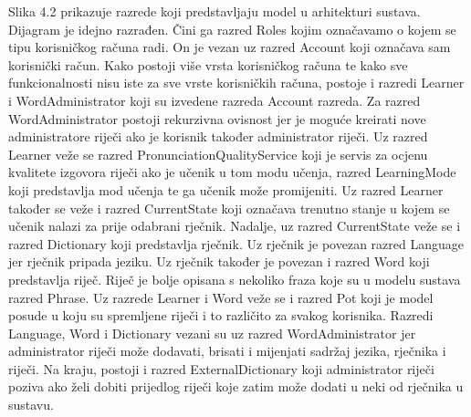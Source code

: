 			\newpage
			
			Slika 4.2 prikazuje razrede koji predstavljaju model u arhitekturi sustava. Dijagram je idejno razrađen. Čini ga razred Roles kojim označavamo o kojem se tipu korisničkog računa radi. On je vezan uz razred Account koji označava sam korisnički račun. Kako postoji više vrsta korisničkog računa te kako sve funkcionalnosti nisu iste za sve vrste korisničkih računa, postoje i razredi Learner i WordAdministrator koji su izvedene razreda Account razreda. Za razred WordAdministrator postoji rekurzivna ovisnost jer je moguće kreirati nove administratore riječi ako je korisnik također administrator riječi. Uz razred Learner veže se razred PronunciationQualityService koji je servis za ocjenu kvalitete izgovora riječi ako je učenik u tom modu učenja, razred LearningMode koji predstavlja mod učenja te ga učenik može promijeniti. Uz razred Learner također se veže i razred CurrentState koji označava trenutno stanje u kojem se učenik nalazi za prije odabrani rječnik. Nadalje, uz razred CurrentState veže se i razred Dictionary koji predstavlja rječnik. Uz rječnik je povezan razred Language jer rječnik pripada jeziku. Uz rječnik također je povezan i razred Word koji predstavlja riječ. Riječ je bolje opisana s nekoliko fraza koje su u modelu sustava razred Phrase. Uz razrede Learner i Word veže se i razred Pot koji je model posude u koju su spremljene riječi i to različito za svakog korisnika. Razredi Language, Word i Dictionary vezani su uz razred WordAdministrator jer administrator riječi može dodavati, brisati i mijenjati sadržaj jezika, rječnika i riječi. Na kraju, postoji i razred ExternalDictionary koji administrator riječi poziva ako želi dobiti prijedlog riječi koje zatim može dodati u neki od rječnika u sustavu. \newpage
			
